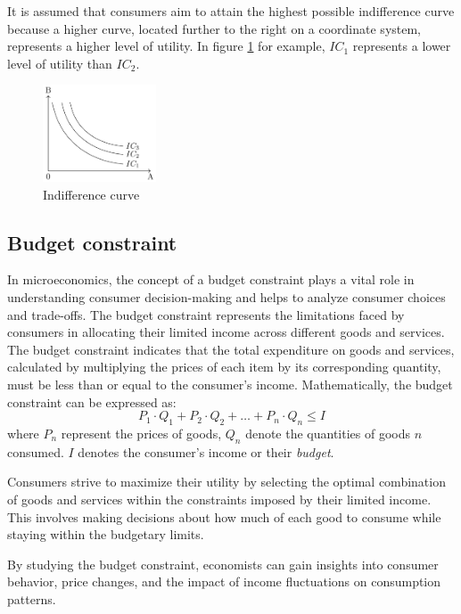 \documentclass[
  12pt,
  oneside]{book}
\theoremstyle{definition}
\theoremstyle{definition}
\theoremstyle{definition}
\theoremstyle{definition}
\theoremstyle{remark}
\begin{document}
It is assumed that consumers aim to attain the highest possible indifference curve because a higher curve, located further to the right on a coordinate system, represents a higher level of utility. In figure \ref{fig:ic2} for example, \(IC_1\) represents a lower level of utility than \(IC_2\).

\begin{figure}
\centering
\includegraphics[width=0.3\textwidth,height=\textheight]{fig/ic2.png}
\caption{\label{fig:ic2} Indifference curve}
\end{figure}

\hypertarget{budget-constraint}{%
\subsection{Budget constraint}\label{budget-constraint}}

In microeconomics, the concept of a budget constraint plays a vital role in understanding consumer decision-making and helps to analyze consumer choices and trade-offs. The budget constraint represents the limitations faced by consumers in allocating their limited income across different goods and services. The budget constraint indicates that the total expenditure on goods and services, calculated by multiplying the prices of each item by its corresponding quantity, must be less than or equal to the consumer's income.
Mathematically, the budget constraint can be expressed as:
\[
P_1 \cdot Q_1 + P_2 \cdot Q_2 + \ldots + P_n \cdot Q_n \leq I
\]
where \(P_n\) represent the prices of goods, \(Q_n\) denote the quantities of goods \(n\) consumed. \(I\) denotes the consumer's income or their \emph{budget}.

Consumers strive to maximize their utility by selecting the optimal combination of goods and services within the constraints imposed by their limited income. This involves making decisions about how much of each good to consume while staying within the budgetary limits.

By studying the budget constraint, economists can gain insights into consumer behavior, price changes, and the impact of income fluctuations on consumption patterns.
\end{document}
